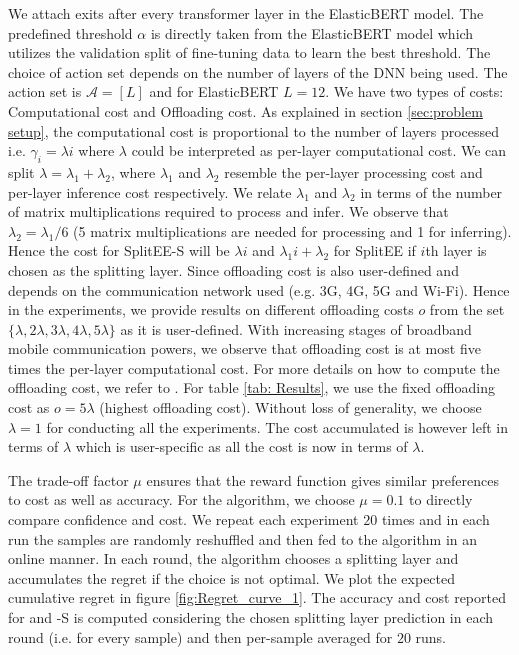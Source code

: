 We attach exits after every transformer layer in the ElasticBERT model. The predefined threshold $\alpha$ is directly taken from the ElasticBERT model which utilizes the validation split of fine-tuning data to learn the best threshold. The choice of action set depends on the number of layers of the DNN being used. The action set is $\mathcal{A} = [L]$ and for ElasticBERT $L = 12$. 
We have two types of costs: Computational cost and Offloading cost. As explained in section \ref{sec:problem setup}, the computational cost is proportional to the number of layers processed i.e. $\gamma_i = \lambda i$ where $\lambda$ could be interpreted as per-layer computational cost. We can split $\lambda = \lambda_1+\lambda_2$, where $\lambda_1$ and $\lambda_2$ resemble the per-layer processing cost and per-layer inference cost respectively. We relate $\lambda_1$ and $ \lambda_2$ in terms of the number of matrix multiplications required to process and infer. We observe that $\lambda_2 = \lambda_1/6$ (5 matrix multiplications are needed for processing and 1 for inferring). Hence the cost for SplitEE-S will be $\lambda i $ and $\lambda_1 i + \lambda_2$ for SplitEE if $i$th layer is chosen as the splitting layer.
Since offloading cost is also user-defined and depends on the communication network used (e.g. 3G, 4G, 5G and Wi-Fi). Hence in the experiments, we provide results on different offloading costs $o$ from the set $\{\lambda, 2\lambda, 3\lambda, 4\lambda, 5\lambda\}$ as it is user-defined. With increasing stages of broadband mobile communication powers, we observe that offloading cost is at most five times the per-layer computational cost. For more details on how to compute the offloading cost, we refer to \cite{kuang2019partial}. For table \ref{tab: Results}, we use the fixed offloading cost as $o = 5\lambda$ (highest offloading cost). Without loss of generality, we choose $\lambda = 1$ for conducting all the experiments. The cost accumulated is however left in terms of $\lambda$ which is user-specific as all the cost is now in terms of $\lambda$.




The trade-off factor $\mu$ ensures that the reward function gives similar preferences to cost as well as accuracy. For the algorithm, we choose $\mu = 0.1$ to directly compare confidence and cost.
We repeat each experiment $ 20$ times and in each run the samples are randomly reshuffled and then fed to the algorithm in an online manner. In each round, the algorithm chooses a splitting layer and accumulates the regret if the choice is not optimal. We plot the expected cumulative regret in figure \ref{fig:Regret_curve_1}. The accuracy and cost reported for \our{} and \our{}-S is computed considering the chosen splitting layer prediction in each round (i.e. for every sample) and then per-sample averaged for $20$ runs.



